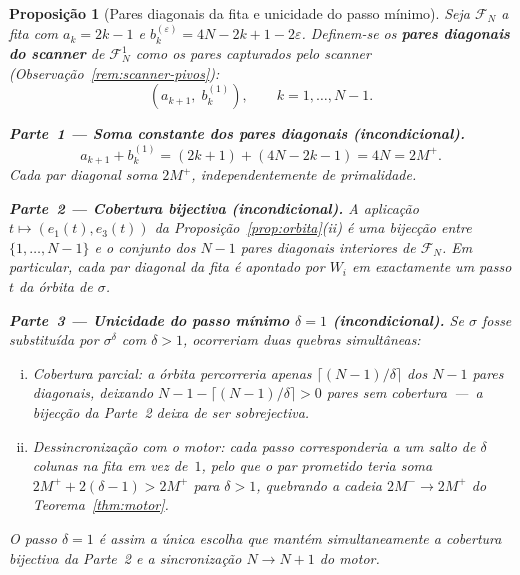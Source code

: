 \documentclass[12pt, a4paper]{article}
\theoremstyle{plain}
\newtheorem{proposition}[theorem]{Proposição}
\theoremstyle{definition}
\theoremstyle{remark}
\begin{document}
	\begin{proposition}[Pares diagonais da fita e unicidade do passo mínimo]
		\label{prop:pares-diagonais}
		Seja $\mathcal{F}_N$ a fita com $a_k=2k-1$ e
		$b_k^{(\varepsilon)}=4N-2k+1-2\varepsilon$.  Definem-se os
		\textbf{pares diagonais do scanner} de $\mathcal{F}_N^1$ como os
		pares capturados pelo scanner (Observação~\ref{rem:scanner-pivos}):
		\[
		(a_{k+1},\;b_k^{(1)}),\qquad k=1,\ldots,N-1.
		\]
		
		\medskip
		\noindent\textbf{Parte~1 --- Soma constante dos pares diagonais
			(incondicional).}
		\[
		a_{k+1}+b_k^{(1)}
		=(2k+1)+(4N-2k-1)
		=4N
		=2M^+.
		\]
		Cada par diagonal soma $2M^+$, independentemente de primalidade.
		
		\medskip
		\noindent\textbf{Parte~2 --- Cobertura bijectiva (incondicional).}
		A aplicação $t\mapsto(e_1(t),e_3(t))$ da
		Proposição~\ref{prop:orbita}(ii) é uma bijecção entre
		$\{1,\ldots,N-1\}$ e o conjunto dos $N-1$ pares diagonais
		interiores de $\mathcal{F}_N$.  Em particular, cada par diagonal
		da fita é \emph{apontado} por $W_i$ em exactamente um passo
		$t$ da órbita de $\sigma$.
		
		\medskip
		\noindent\textbf{Parte~3 --- Unicidade do passo mínimo $\delta=1$
			(incondicional).}
		Se $\sigma$ fosse substituída por $\sigma^\delta$ com $\delta>1$,
		ocorreriam duas quebras simultâneas:
		\begin{enumerate}[(i)]
			\item \emph{Cobertura parcial}: a órbita percorreria apenas
			$\lceil(N-1)/\delta\rceil$ dos $N-1$ pares diagonais,
			deixando $N-1-\lceil(N-1)/\delta\rceil>0$ pares sem
			cobertura~---~a bijecção da Parte~2 deixa de ser sobrejectiva.
			\item \emph{Dessincronização com o motor}: cada passo
			corresponderia a um salto de $\delta$ colunas na fita em vez
			de~$1$, pelo que o par prometido teria soma
			$2M^++2(\delta-1)>2M^+$ para $\delta>1$, quebrando a cadeia
			$2M^-\to2M^+$ do Teorema~\ref{thm:motor}.
		\end{enumerate}
		O passo $\delta=1$ é assim a \emph{única} escolha que mantém
		simultaneamente a cobertura bijectiva da Parte~2 e a
		sincronização $N\to N{+}1$ do motor.
	\end{proposition}
	
\end{document}
